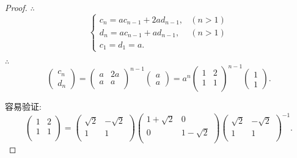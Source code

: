 \documentclass[color=black,device=normal,lang=cn,mode=geye]{elegantnote}
\begin{document}
\begin{proof}
    $\therefore$
    \[\begin{cases}
        c_n=ac_{n-1}+2ad_{n-1}, & (n>1) \\
        d_n=ac_{n-1}+ad_{n-1}, & (n>1) \\
        c_1=d_1=a.
    \end{cases}\]

    $\therefore$
    \[\begin{pmatrix}
        c_n \\ d_n
    \end{pmatrix}=\begin{pmatrix}
        a & 2a \\
        a & a \\
    \end{pmatrix}^{n-1}\begin{pmatrix}
        a \\ a
    \end{pmatrix}=a^n\begin{pmatrix}
        1 & 2 \\
        1 & 1 \\
    \end{pmatrix}^{n-1}\begin{pmatrix}
        1 \\ 1
    \end{pmatrix}.\]

    容易验证:
    \[\begin{pmatrix}
        1 & 2 \\
        1 & 1 \\
    \end{pmatrix}=\begin{pmatrix}
        \sqrt{2} & -\sqrt{2} \\
        1 & 1 \\
    \end{pmatrix}\begin{pmatrix}
        1+\sqrt{2} & 0 \\
        0 & 1-\sqrt{2} \\
    \end{pmatrix}\begin{pmatrix}
        \sqrt{2} & -\sqrt{2} \\
        1 & 1 \\
    \end{pmatrix}^{-1}.\]


\end{proof}
\end{document}
